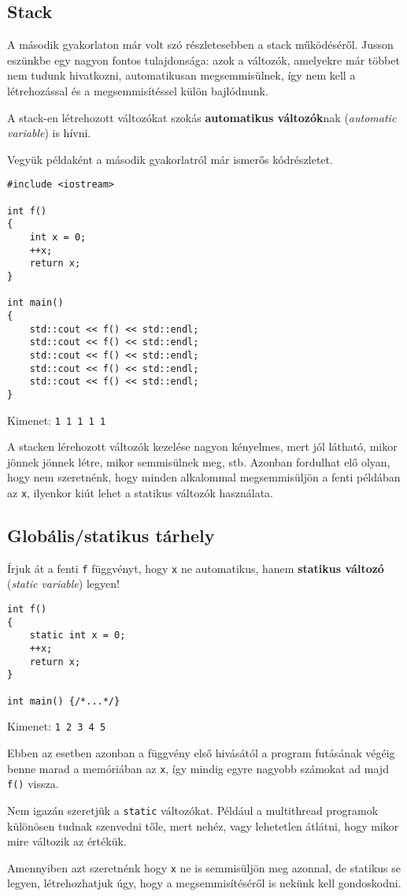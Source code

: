 \documentclass[a4paper,11.5pt]{article}
\begin{document}
	\subsection{Stack}
	A második gyakorlaton már volt szó részletesebben a stack működéséről. Jusson eszünkbe egy nagyon fontos tulajdonsága: azok a változók, amelyekre már többet nem tudunk hivatkozni, automatikusan megsemmisülnek, így nem kell a létrehozással és a megsemmisítéssel külön bajlódnunk.
	\smallskip
	
	A stack-en létrehozott változókat szokás \textbf{automatikus változók}nak (\textit{automatic variable}) is hívni.
	
	\smallskip
	Vegyük példaként a második gyakorlatról már ismerős kódrészletet.
	
	\begin{lstlisting}
#include <iostream>

int f()
{
	int x = 0;
	++x;
	return x;
}

int main()
{
	std::cout << f() << std::endl;
	std::cout << f() << std::endl;
	std::cout << f() << std::endl;
	std::cout << f() << std::endl;
	std::cout << f() << std::endl;
}
	\end{lstlisting}
	Kimenet: \texttt{1 1 1 1 1}
	\smallskip
	
	A stacken lérehozott változók kezelése nagyon kényelmes, mert jól látható, mikor jönnek jönnek létre, mikor semmisülnek meg, stb. Azonban fordulhat elő olyan, hogy nem szeretnénk, hogy minden alkalommal megsemmisüljön a fenti példában az \texttt{x}, ilyenkor kiút lehet a statikus változók használata.
	\subsection{Globális/statikus tárhely}
	Írjuk át a fenti \texttt{f} függvényt, hogy \texttt{x} ne automatikus, hanem \textbf{statikus változó} (\textit{static variable}) legyen!
	\begin{lstlisting}
int f()
{
	static int x = 0;
	++x;
	return x;
}

int main() {/*...*/}
	\end{lstlisting}
	Kimenet: \texttt{1 2 3 4 5}
	
	Ebben az esetben azonban a függvény első hivásától a program futásának végéig benne marad a memóriában az \texttt{x}, így mindig egyre nagyobb számokat ad majd \texttt{f()} vissza.
	\begin{note}
		Nem igazán szeretjük a \texttt{static} változókat. Például a multithread programok különösen tudnak szenvedni tőle, mert nehéz, vagy lehetetlen átlátni, hogy mikor mire változik az értékük.
	\end{note}
	Amennyiben azt szeretnénk hogy \texttt{x} ne is semmisüljön meg azonnal, de statikus se legyen, létrehozhatjuk úgy, hogy a megsemmisítéséről is nekünk kell gondoskodni.
\end{document}
